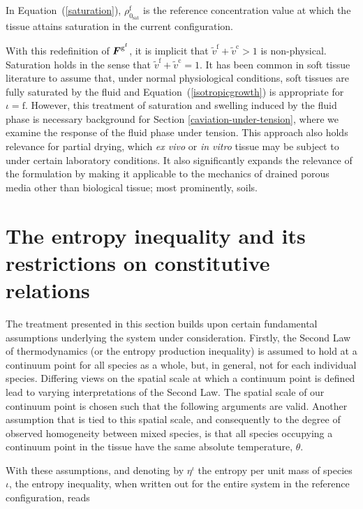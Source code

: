 \noindent In Equation~(\ref{saturation}),
$\rho_{0_{\mathrm{sat}}}^\mathrm{f}$ is the reference concentration
value at which the tissue attains saturation in the current
configuration.

With this redefinition of $\mbox{\boldmath$ F$}^{\mathrm{g}^\mathrm{f}}$, it is
implicit that $\tilde{v}^\mathrm{f} + \tilde{v}^\mathrm{c} > 1$ is
non-physical. Saturation holds in the sense that $\tilde{v}^\mathrm{f}
+ \tilde{v}^\mathrm{c} = 1$. It has been common in soft tissue
literature to assume that, under normal physiological conditions, soft
tissues are fully saturated by the fluid and
\mbox{Equation~(\ref{isotropicgrowth})} is appropriate for $\iota =
\mathrm{f}$. However, this treatment of saturation and swelling
induced by the fluid phase is necessary background for Section
\ref{caviation-under-tension}, where we examine the response of the
fluid phase under tension. This approach also holds relevance for
partial drying, which \emph{ex vivo} or \emph{in vitro} tissue may be
subject to under certain laboratory conditions. It also significantly
expands the relevance of the formulation by making it applicable to
the mechanics of drained porous media other than biological tissue;
most prominently, soils.

\section{The entropy inequality and its restrictions on constitutive
  relations}
\label{entropy-inequality}

The treatment presented in this section builds upon certain
fundamental assumptions underlying the system under
consideration. Firstly, the Second Law of thermodynamics (or the
entropy production inequality) is assumed to hold at a continuum point
for all species as a whole, but, in general, not for each individual
species. Differing views on the spatial scale at which a continuum
point is defined lead to varying interpretations of the Second
Law. The spatial scale of our continuum point is chosen such that the
following arguments are valid. Another assumption that is tied to this
spatial scale, and consequently to the degree of observed homogeneity
between mixed species, is that all species occupying a continuum point
in the tissue have the same absolute temperature, $\theta$.

With these assumptions, and denoting by $\eta^\iota$ the entropy per
unit mass of species~$\iota$, the entropy inequality, when written out
for the entire system in the reference configuration, reads

